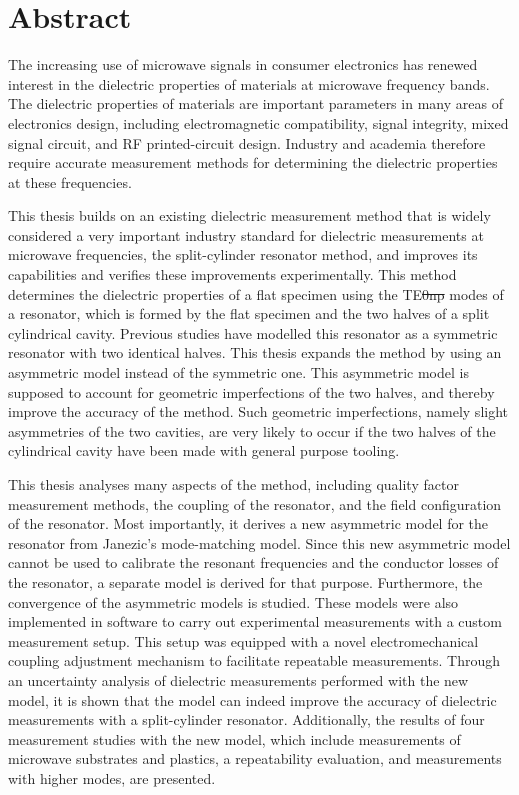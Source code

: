 \chapter*{Abstract}
The increasing use of microwave signals in consumer electronics has renewed interest in the dielectric properties of materials at microwave frequency bands. The dielectric properties of materials are important parameters in many areas of electronics design, including electromagnetic compatibility, signal integrity, mixed signal circuit, and RF printed-circuit design. Industry and academia therefore require accurate measurement methods for determining the dielectric properties at these frequencies. 

This thesis builds on an existing dielectric measurement method that is widely considered a very important industry standard for dielectric measurements at microwave frequencies, the split-cylinder resonator method, and improves its capabilities and verifies these improvements experimentally. This method determines the dielectric properties of a flat specimen using the TE\st{0np} modes of a resonator, which is formed by the flat specimen and the two halves of a split cylindrical cavity. Previous studies have modelled this resonator as a symmetric resonator with two identical halves. This thesis expands the method by using an asymmetric model instead of the symmetric one. This asymmetric model is supposed to account for geometric imperfections of the two halves, and thereby improve the accuracy of the method. Such geometric imperfections, namely slight asymmetries of the two cavities, are very likely to occur if the two halves of the cylindrical cavity have been made with general purpose tooling. 

This thesis analyses many aspects of the method, including quality factor measurement methods, the coupling of the resonator, and the field configuration of the resonator. Most importantly, it derives a new asymmetric model for the resonator from Janezic's mode-matching model. Since this new asymmetric model cannot be used to calibrate the resonant frequencies and the conductor losses of the resonator, a separate model is derived for that purpose. Furthermore, the convergence of the asymmetric models is studied. These models were also implemented in software to carry out experimental measurements with a custom measurement setup. This setup was equipped with a novel electromechanical coupling adjustment mechanism to facilitate repeatable measurements. Through an uncertainty analysis of dielectric measurements performed with the new model, it is shown that the model can indeed improve the accuracy of dielectric measurements with a split-cylinder resonator. Additionally, the results of four measurement studies with the new model, which include measurements of microwave substrates and plastics, a repeatability evaluation, and measurements with higher modes, are presented.
\pagebreak

